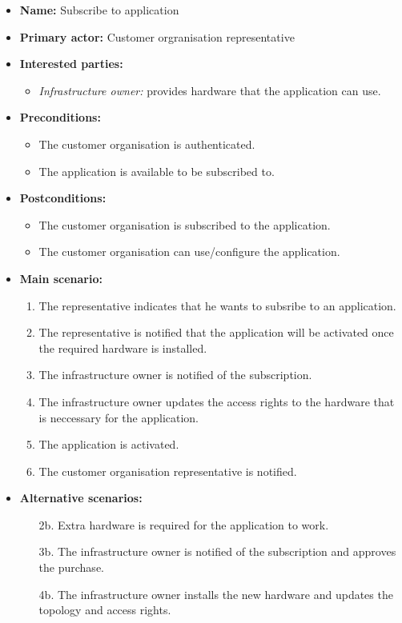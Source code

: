\begin{itemize}
    \item \textbf{Name:} Subscribe to application
    \item \textbf{Primary actor:} Customer orgranisation representative
    \item \textbf{Interested parties:}
        \begin{itemize}
            \item \textit{Infrastructure owner:} provides hardware that the application can use.
        \end{itemize}

    \item \textbf{Preconditions:}
        \begin{itemize}
            \item The customer organisation is authenticated.
            \item The application is available to be subscribed to.
        \end{itemize}

    \item \textbf{Postconditions:}
        \begin{itemize}
            \item The customer organisation is subscribed to the application.
            \item The customer organisation can use/configure the application.
        \end{itemize}

    \item \textbf{Main scenario:}
    \begin{enumerate}
       \item The representative indicates that he wants to subsribe to an
             application.
       \item The representative is notified that the application will be activated
             once the required hardware is installed.
       \item The infrastructure owner is notified of the subscription.
       \item The infrastructure owner updates the access rights to the hardware
             that is neccessary for the application.
       \item The application is activated.
       \item The customer organisation representative is notified.
    \end{enumerate}

    \item \textbf{Alternative scenarios:}
    \begin{enumerate}
        \item [2b.] Extra hardware is required for the application to work.
        \item [3b.] The infrastructure owner is notified of the subscription and
                    approves the purchase.
        \item [4b.] The infrastructure owner installs the new hardware and updates
                    the topology and access rights.
    \end{enumerate}
\end{itemize}


